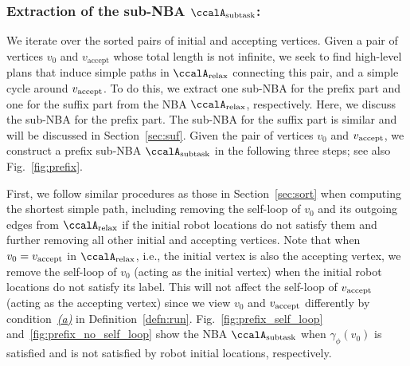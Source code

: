 \documentclass[Afour,sageh,times]{sagej}
\newcommand{\auto}[1]{\ccalA_{\textup{#1}}}
\newcommand{\vertex}[1]{v_{\textup{#1}}}
\begin{document}


  \subsubsection{Extraction of the sub-NBA \upshape $\auto{subtask}$:}\label{sub-NBA:1}
  We iterate over the sorted pairs of initial and accepting vertices. Given a pair of vertices  $v_0$ and $v_\text{accept}$ whose total length is not infinite, we seek to find  high-level plans that induce simple paths in $\auto{relax}$  connecting this pair, and a simple cycle around $\vertex{accept}$. To do this,  we extract one sub-NBA for the prefix part and one for the suffix part from the NBA $\auto{relax}$, respectively.  Here, we discuss the sub-NBA for the prefix part. The  sub-NBA for the suffix part is similar and will be  discussed in Section~\ref{sec:suf}.  Given the pair of vertices $v_0$ and $\vertex{accept}$, we construct a prefix sub-NBA $\auto{subtask}$ in the following three steps; see also Fig.~\ref{fig:prefix}.

  First, we follow similar procedures as those in Section~\ref{sec:sort} when computing the shortest simple path, including removing the self-loop of $v_0$ and its outgoing edges from $\auto{relax}$ if the initial robot locations do not satisfy them and further removing all other initial and accepting vertices.  Note that when $v_0 = \vertex{accept}$ in $\auto{relax}$, i.e., the initial vertex is also the accepting vertex, we remove the self-loop of $v_0$ (acting as the initial vertex) when the initial robot locations do not satisfy its label. This will not affect the self-loop of $\vertex{accept}$ (acting as the accepting vertex) since  we view $v_0$ and $\vertex{accept}$ differently by condition~\hyperref[cond:a]{\it (a)} in Definition~\ref{defn:run}. Fig.~\ref{fig:prefix_self_loop}  and~\ref{fig:prefix_no_self_loop} show  the NBA  $\auto{subtask}$  when $\gamma_{\phi}(v_0)$ is satisfied and is not satisfied  by robot initial locations, respectively.
\end{document}
